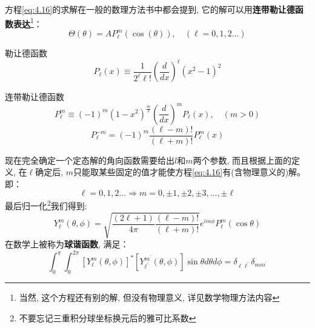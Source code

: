 \documentclass[a4paper,zihao=-4,linespread=1]{ctexrep}
\newenvironment{lequation}{\large\begin{equation}}{\end{equation}}
\begin{document}
    方程\ref{eq:4.16}的求解在一般的数理方法书中都会提到, 它的解可以用\textbf{连带勒让德函数表达}\footnote{当然, 这个方程还有别的解, 但没有物理意义, 详见数学物理方法内容}：
    \begin{equation}
        \Theta(\theta)=AP_\ell^m\left(\cos\left(\theta\right)\right),\quad(\ell=0,1,2\ldots)
    \end{equation}
    \begin{define}{勒让德函数}
        \begin{lequation}
            P_\ell(x)\equiv\frac{1}{2^\ell\ell!}\left(\frac{d}{dx}\right)^\ell\left(x^2-1\right)^2
        \end{lequation}
    \end{define}
    \begin{define}{连带勒让德函数}
        \begin{lequation}
            P_\ell^m\equiv(-1)^m\left(1-x^2\right)^\frac{m}{2}\left(\frac{d}{dx}\right)^mP_\ell(x),\quad(m>0)
        \end{lequation}
        \begin{lequation}
            P_\ell^{-m}=(-1)^m\frac{\left(\ell-m\right)!}{\left(\ell+m\right)!}P_\ell^m(x)
        \end{lequation}
    \end{define}
    现在完全确定一个定态解的角向函数需要给出$l$和$m$两个参数, 而且根据上面的定义, 在$\ell$确定后, $m$只能取某些固定的值才能使方程\ref{eq:4.16}有(含物理意义的)解。即：
    \[\ell=0,1,2\ldots\Rightarrow m=0,\pm 1,\pm 2,\pm 3,\ldots, \pm \ell\]
    最后归一化\footnote{不要忘记三重积分球坐标换元后的雅可比系数}我们得到:
    \begin{lequation}
        \boxed{Y_{\ell}^{m}(\theta, \phi)=\sqrt{\frac{(2 \ell+1)}{4 \pi} \frac{(\ell-m) !}{(\ell+m) !}} e^{i m \phi} P_{\ell}^{m}(\cos \theta)}
    \end{lequation}
    在数学上被称为\textbf{球谐函数}, 满足：
    \begin{equation}
        \int_{0}^{\pi} \int_{0}^{2 \pi}\left[Y_{\ell}^{m}(\theta, \phi)\right]^{*}\left[Y_{\ell^{\prime}}^{m^{\prime}}(\theta, \phi)\right] \sin \theta d \theta d \phi=\delta_{\ell \ell^{\prime}} \delta_{m m^{\prime}}
    \end{equation}
\end{document}
